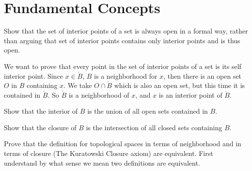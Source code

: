 \section{Fundamental Concepts}
Show that the set of interior points of a set is always open in a formal way, rather than arguing that set of interior points contains only interior points and is thus open.

We want to prove that every point in the set of interior points of a set is its self interior point. Since $x\in \mathring{B}$, $B$ is a neighborhood for $x$, then there is an open set $O$ in $B$ containing $x$. We take $O\cap \mathring{B}$ which is also an open set, but this time it is contained in $\mathring{B}$. So $\mathring{B}$ is a neighborhood of $x$, and $x$ is an interior point of $\mathring{B}$.

Show that the interior of $B$ is the union of all open sets contained in $B$.

Show that the closure of $B$ is the intersection of all closed sets containing $B$.

Prove that the definition for topological spaces in terms of neighborhood and in terms of closure (The Kuratowski Closure axiom) are equivalent. First understand by what sense we mean two definitions are equivalent.